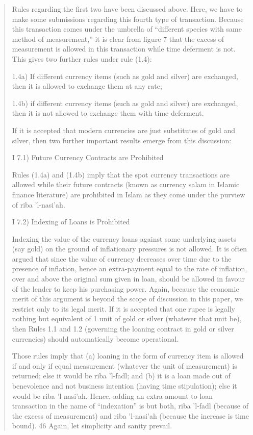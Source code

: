\begin{quote}
Rules regarding the first two have been discussed above. Here, we have to make some submissions regarding this fourth type of transaction. Because this transaction comes under the umbrella of “different species with same method of measurement,” it is clear from figure 7 that the excess of measurement is allowed in this transaction while time deferment is not. This gives two further rules under rule (1.4):

1.4a) If different currency items (such as gold and silver) are exchanged, then it is allowed to exchange them at any rate;

1.4b) if different currency items (such as gold and silver) are exchanged, then it is not allowed to exchange them with time deferment.

If it is accepted that modern currencies are just substitutes of gold and silver, then two further important results emerge from this discussion:

I 7.1) Future Currency Contracts are Prohibited

Rules (1.4a) and (1.4b) imply that the spot currency transactions are allowed while their future contracts (known as currency salam in Islamic finance literature) are prohibited in Islam as they come under the purview of riba 'l-nasi'ah.

I 7.2) Indexing of Loans is Prohibited

Indexing the value of the currency loans against some underlying assets (say gold) on the ground of inflationary pressures is not allowed. It is often argued that since the value of currency decreases over time due to the presence of inflation, hence an extra-payment equal to the rate of inflation, over and above the original sum given in loan, should be allowed in favour of the lender to keep his purchasing power. Again, because the economic merit of this argument is beyond the scope of discussion in this paper, we restrict only to its legal merit. If it is accepted that one rupee is legally nothing but equivalent of 1 unit of gold or silver (whatever that unit be), then Rules 1.1 and 1.2 (governing the loaning contract in gold or silver currencies) should automatically become operational.

Those rules imply that (a) loaning in the form of currency item is allowed if and only if equal measurement (whatever the unit of measurement) is returned; else it would be riba 'l-fadl; and (b) it is a loan made out of benevolence and not business intention (having time stipulation); else it would be riba 'l-nasi'ah. Hence, adding an extra amount to loan transaction in the name of “indexation” is but both, riba 'l-fadl (because of the excess of measurement) and riba 'l-nasi'ah (because the increase is time bound). 46 Again, let simplicity and sanity prevail.


\end{quote}

